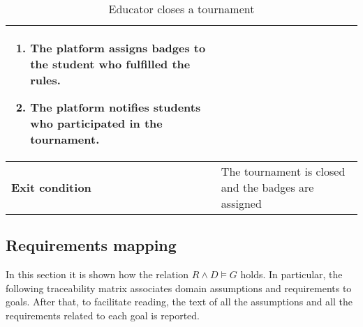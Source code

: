 \begin{enumerate}[label=\textbf{UC\arabic*}:,ref=UC\arabic*,leftmargin=1.3cm]
{\begin{table}[H]
\begin{tabular}{|l|p{11.9cm}|}
\begin{enumerate}[label=\arabic*.]
                              \item The platform assigns badges to the student who fulfilled the rules.
                              \item The platform notifies students who participated in the tournament.
                        \end{enumerate} \\\hline
                        \textbf{Exit condition}  & The tournament is closed and the badges are assigned       \\\hline
                  \end{tabular}
                  \caption{Educator closes a tournament   }
                  \label{table:Educator closes a tournament   }
            \end{table}
            \begin{adjustbox}{
                        max size={\textwidth}{},
                        caption={Educator closes a tournament},
                        label={fig:Educator closes a tournament},
                        figure=H}
                  \centering
            \end{adjustbox}
      }
\end{enumerate}
\pagebreak

\subsection{Requirements mapping}
In this section it is shown how the relation $R\land D \models G$ holds.
In particular, the following traceability matrix associates domain assumptions and requirements to goals.
After that, to facilitate reading, the text of all the assumptions and all the requirements related to each goal is reported.

